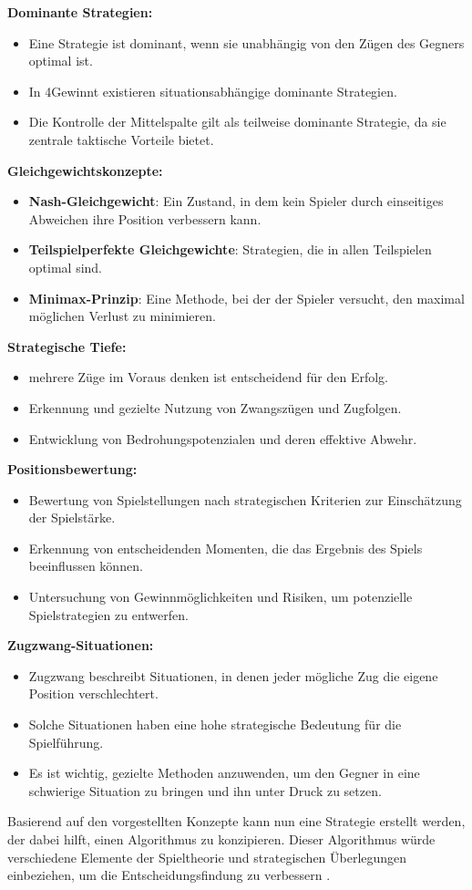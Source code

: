 \textbf{Dominante Strategien:}
\begin{itemize}
	\item Eine Strategie ist dominant, wenn sie unabhängig von den Zügen des Gegners optimal ist.
	\item In 4Gewinnt existieren situationsabhängige dominante Strategien.
	\item Die Kontrolle der Mittelspalte gilt als teilweise dominante Strategie, da sie zentrale taktische Vorteile bietet.
\end{itemize}

\textbf{Gleichgewichtskonzepte:}
\begin{itemize}
	\item \textbf{Nash-Gleichgewicht}: Ein Zustand, in dem kein Spieler durch einseitiges Abweichen ihre Position verbessern kann.
	\item \textbf{Teilspielperfekte Gleichgewichte}: Strategien, die in allen Teilspielen optimal sind.
	\item \textbf{Minimax-Prinzip}: Eine Methode, bei der der Spieler versucht, den maximal möglichen Verlust zu minimieren.
\end{itemize}

\textbf{Strategische Tiefe:}
\begin{itemize}
	\item mehrere Züge im Voraus denken ist entscheidend für den Erfolg.
	\item Erkennung und gezielte Nutzung von Zwangszügen und Zugfolgen.
	\item Entwicklung von Bedrohungspotenzialen und deren effektive Abwehr.
\end{itemize}

\textbf{Positionsbewertung:}
\begin{itemize}
	\item Bewertung von Spielstellungen nach strategischen Kriterien zur Einschätzung der Spielstärke.
	\item Erkennung von entscheidenden Momenten, die das Ergebnis des Spiels beeinflussen können.
	\item Untersuchung von Gewinnmöglichkeiten und Risiken, um potenzielle Spielstrategien zu entwerfen.
\end{itemize}

\textbf{Zugzwang-Situationen:}
\begin{itemize}
	\item Zugzwang beschreibt Situationen, in denen jeder mögliche Zug die eigene Position verschlechtert.
	\item Solche Situationen haben eine hohe strategische Bedeutung für die Spielführung.
	\item Es ist wichtig, gezielte Methoden anzuwenden, um den Gegner in eine schwierige Situation zu bringen und ihn unter Druck zu setzen.
\end{itemize}

Basierend auf den vorgestellten Konzepte kann nun eine Strategie erstellt werden, der dabei hilft, einen Algorithmus zu konzipieren. Dieser Algorithmus würde verschiedene Elemente der Spieltheorie und strategischen Überlegungen einbeziehen, um die Entscheidungsfindung zu verbessern \autocites{monien_alphabeta-algorithmus_2008}.